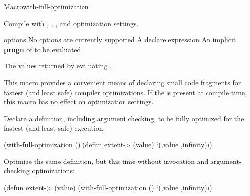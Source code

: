\documentclass[10pt,twoside,english,pdftex]{article}
\begin{document}
\begin{functiondoc}{Macro}{with-full-optimization}%
  {\code{(}\superstar{}\code{)}
    \superstar{}
    \superstar{} 
    \returns{} \superstar}
%
  
\fnsyntax

\fnpurpose Compile  with , , , and  optimization
settings.

\fnpackage {}

\fnmodule {}

\fnargs
\begin{args}{options}
\arg[option] No options are currently supported
\arg[declaration] A declare expression
\arg[forms] An implicit \textbf{progn} of  to be evaluated
\end{args}

\fnreturns The values returned by evaluating .

\fndescription
{}%
This macro provides a convenient means of declaring small code fragments for
fastest (and least safe) compiler optimizations.  If the 
\textbf{} is present at compile time, this macro
has no effect on optimization settings.

\fnexamples Declare a  definition, including argument checking,
to be fully optimized for the fastest (and least safe) execution:
%
\W\supp
\begin{example}
  (with-full-optimization ()
    (defun extent-> (value)
      `(,value ,infinity)))
\end{example}
%
Optimize the same  definition, but this time without
invocation and argument-checking optimizations:
%
\W\supp\notpretop
\begin{example}
  (defun extent-> (value)
    (with-full-optimization ()
      `(,value ,infinity)))
\end{example}

\end{functiondoc}

\end{document}

